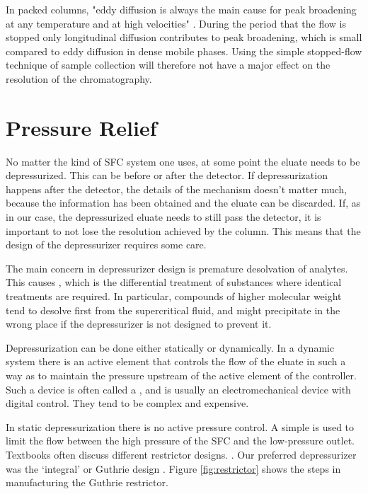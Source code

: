 In packed columns, "eddy diffusion is always the main cause for peak broadening
at any temperature and at high velocities" \autocite{Gritti2006}. During the
period that the flow is stopped only longitudinal diffusion contributes to peak
broadening, which is small compared to eddy diffusion in dense mobile phases.
Using the simple stopped-flow technique of sample collection will therefore not
have a major effect on the resolution of the \oneD chromatography.


\section{Pressure Relief}
\label{sec:Restrictor}

No matter the kind of SFC system one uses, at some point the eluate needs to be
depressurized. This can be before or after the detector. If depressurization
happens after the detector, the details of the mechanism doesn't matter
much, because the information has been obtained and the eluate can be discarded.
If, as in our case, the depressurized eluate needs to still pass the detector,
it is important to not lose the resolution achieved by the column.
This means that the design of the depressurizer requires some care.

The main concern in depressurizer design is premature desolvation of analytes.
This causes , which is the differential treatment of
substances where identical treatments are required. In particular, compounds of
higher molecular weight tend to desolve first from the supercritical fluid, and
might precipitate in the wrong place if the depressurizer is not designed to
prevent it. 

Depressurization can be done either statically or dynamically. In a dynamic
system there is an active element that controls the flow of the eluate in such a
way as to maintain the pressure upstream of the active element of the
controller. Such a device is often called a ,
and is usually an electromechanical device with digital control. They tend to
be complex and expensive.

In static depressurization there is no active pressure control. A simple
 is used to limit the flow between the high pressure of the
SFC and the low-pressure outlet. Textbooks often discuss different restrictor
designs. \autocite[The book by][provides an example.]{LuquedeCastro1994}. Our
preferred depressurizer was the `integral' or Guthrie design
\autocite{Guthrie1986}. Figure \ref{fig:restrictor} shows the steps in
manufacturing the Guthrie restrictor.

